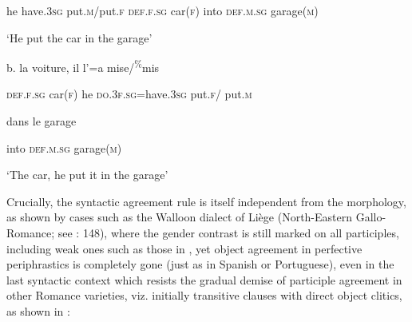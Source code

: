 \documentclass[output=paper]{langscibook}
\begin{document}
\begin{styleTabellaLUNGA}
    he   have.3\textsc{sg}  put.\textsc{m/}put.\textsc{f}   \textsc{def.f.sg}  car(\textsc{f})    into     \textsc{def.m.sg}  garage(\textsc{m})
\end{styleTabellaLUNGA}

\begin{styleTabellaLUNGA}
    ‘He put the car in the garage’
\end{styleTabellaLUNGA}

\begin{styleTabellaLUNGA}
  b.  la     voiture,    il  l’=a           mise/\textsuperscript{\%}mis  
\end{styleTabellaLUNGA}

\begin{styleTabellaLUNGA}
    \textsc{def.f.sg}  car(\textsc{f})    he   \textsc{do.3f.sg}=have.3\textsc{sg}  put.\textsc{f/}  put.\textsc{m}    
\end{styleTabellaLUNGA}

\begin{styleTabellaLUNGA}
    dans   le       garage 
\end{styleTabellaLUNGA}

\begin{styleTabellaLUNGA}
    into   \textsc{def.m.sg}    garage(\textsc{m})
\end{styleTabellaLUNGA}

\begin{styleTabellaLUNGA}
    ‘The car, he put it in the garage’
\end{styleTabellaLUNGA}

Crucially, the syntactic agreement rule is itself independent from the morphology, as shown by cases such as the Walloon dialect of Liège (North-Eastern Gallo-Romance; see \citealt{Remacle1956}: 148), where the gender contrast is still marked on all participles, including weak ones such as those in , yet object agreement in perfective periphrastics is completely gone (just as in Spanish or Portuguese), even in the last syntactic context which resists the gradual demise of participle agreement in other Romance varieties, viz. initially transitive clauses with direct object clitics, as shown in :
\end{document}
